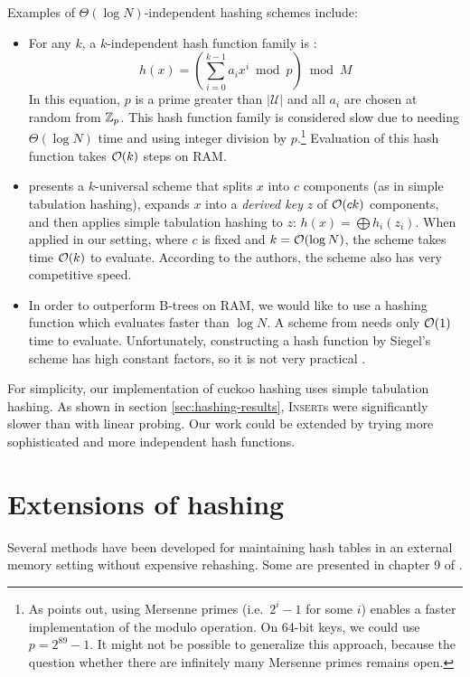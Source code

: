 Examples of $\Theta(\log N)$-independent hashing schemes include:
\begin{itemize}
\item	For any $k$, a $k$-independent hash function family is \cite{new-hash-fns}:
	$$h(x)=\left(\sum_{i=0}^{k-1} a_i x^i \bmod p\right) \bmod M$$
	In this equation, $p$ is a prime greater than $|\mathcal{U}|$
	and all $a_i$ are chosen at random from $\mathbb{Z}_p$.
	This hash function family is considered slow due to needing
	$\Theta(\log N)$ time and using integer division by $p$.\footnote{%
		As \cite{univ-classes} points out, using Mersenne primes
		(i.e.\ $2^i-1$ for some $i$) enables a faster implementation of
		the modulo operation. On 64-bit keys, we could use $p=2^{89}-1$.
		It might not be possible to generalize this approach, because
		the question whether there are infinitely many Mersenne primes
		remains open.
	}
	Evaluation of this hash function takes $\mathcal{O}(k)$ steps on RAM.
\item \cite{tab-based-4uni-hashing} presents a $k$-universal scheme that splits
	$x$ into $c$ components (as in simple tabulation hashing),
	expands $x$ into a \emph{derived key} $z$ of $\mathcal{O}(ck)$ components,
	and then applies simple tabulation hashing to $z$:
	$h(x)=\bigoplus h_i(z_i)$.
	When applied in our setting, where $c$ is fixed and $k=\mathcal{O}(\log N)$,
	the scheme takes time $\mathcal{O}(k)$ to evaluate.
	According to the authors, the scheme also has very competitive speed.
\item In order to outperform B-trees on RAM, we would like to use a hashing
	function which evaluates faster than $\log N$. A scheme from
	\cite{siegel-1995} needs only $\mathcal{O}(1)$ time to evaluate. Unfortunately,
	constructing a hash function by Siegel's scheme has high constant
	factors, so it is not very practical \cite{pagh-phd}.
\end{itemize}


For simplicity, our implementation of cuckoo hashing uses simple tabulation
hashing. As shown in section \ref{sec:hashing-results}, \textsc{Insert}s were
significantly slower than with linear probing. Our work could be extended by
trying more sophisticated and more independent hash functions.

\section{Extensions of hashing}
Several methods have been developed for maintaining hash tables in an external
memory setting without expensive rehashing. Some are presented in chapter 9
of \cite{em-ads}.

